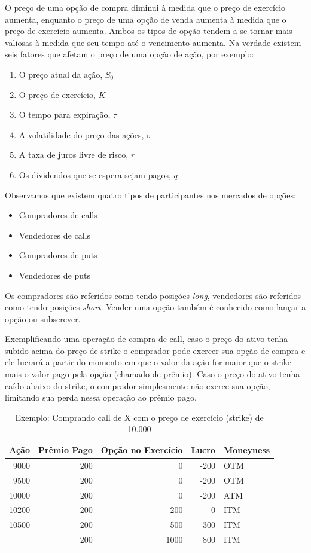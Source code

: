\documentclass[]{book}
\providecommand{\tightlist}{%
  \setlength{\itemsep}{0pt}\setlength{\parskip}{0pt}}
\theoremstyle{definition}
\theoremstyle{definition}
\theoremstyle{definition}
\theoremstyle{remark}
\begin{document}
O preço de uma opção de compra diminui à medida que o preço de exercício
aumenta, enquanto o preço de uma opção de venda aumenta à medida que o
preço de exercício aumenta. Ambos os tipos de opção tendem a se tornar
mais valiosas à medida que seu tempo até o vencimento aumenta. Na
verdade existem seis fatores que afetam o preço de uma opção de ação,
por exemplo:

\begin{enumerate}
\def\labelenumi{\arabic{enumi}.}
\tightlist
\item
  O preço atual da ação, \(S_0\)
\item
  O preço de exercício, \(K\)
\item
  O tempo para expiração, \(\tau\)
\item
  A volatilidade do preço das ações, \(\sigma\)
\item
  A taxa de juros livre de risco, \(r\)
\item
  Os dividendos que se espera sejam pagos, \(q\)
\end{enumerate}

Observamos que existem quatro tipos de participantes nos mercados de
opções:

\begin{itemize}
\tightlist
\item
  Compradores de calls
\item
  Vendedores de calls
\item
  Compradores de puts
\item
  Vendedores de puts
\end{itemize}

Os compradores são referidos como tendo posições \emph{long}, vendedores
são referidos como tendo posições \emph{short}. Vender uma opção também
é conhecido como lançar a opção ou subscrever.

Exemplificando uma operação de compra de call, caso o preço do ativo
tenha subido acima do preço de strike o comprador pode exercer sua opção
de compra e ele lucrará a partir do momento em que o valor da ação for
maior que o strike mais o valor pago pela opção (chamado de prêmio).
Caso o preço do ativo tenha caído abaixo do strike, o comprador
simplesmente não exerce sua opção, limitando sua perda nessa operação ao
prêmio pago.

\begin{table}[t]

\caption{\label{tab:opcao}Exemplo: Comprando call de X com o preço de exercício (strike) de 10.000}
\centering
\begin{tabular}{rrrrl}
\toprule
Ação & Prêmio Pago & Opção no Exercício & Lucro & Moneyness\\
\midrule
9000 & 200 & 0 & -200 & OTM\\
9500 & 200 & 0 & -200 & OTM\\
10000 & 200 & 0 & -200 & ATM\\
10200 & 200 & 200 & 0 & ITM\\
10500 & 200 & 500 & 300 & ITM\\
\addlinespace
11000 & 200 & 1000 & 800 & ITM\\
\bottomrule
\end{tabular}
\end{table}
\end{document}
